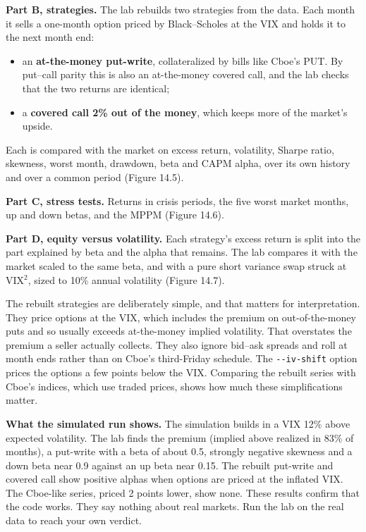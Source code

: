 \textbf{Part B, strategies.} The lab rebuilds two strategies from the data. Each month it sells a one-month option priced by Black--Scholes at the VIX and holds it to the next month end:

\begin{itemize}
  \item an \textbf{at-the-money put-write}, collateralized by bills like Cboe's PUT. By put--call parity this is also an at-the-money covered call, and the lab checks that the two returns are identical;
  \item a \textbf{covered call 2\% out of the money}, which keeps more of the market's upside.
\end{itemize}

Each is compared with the market on excess return, volatility, Sharpe ratio, skewness, worst month, drawdown, beta and CAPM alpha, over its own history and over a common period (Figure 14.5).

\textbf{Part C, stress tests.} Returns in crisis periods, the five worst market months, up and down betas, and the MPPM (Figure 14.6).

\textbf{Part D, equity versus volatility.} Each strategy's excess return is split into the part explained by beta and the alpha that remains. The lab compares it with the market scaled to the same beta, and with a pure short variance swap struck at VIX$^2$, sized to 10\% annual volatility (Figure 14.7).

The rebuilt strategies are deliberately simple, and that matters for interpretation. They price options at the VIX, which includes the premium on out-of-the-money puts and so usually exceeds at-the-money implied volatility. That overstates the premium a seller actually collects. They also ignore bid--ask spreads and roll at month ends rather than on Cboe's third-Friday schedule. The \texttt{-{}-iv-shift} option prices the options a few points below the VIX. Comparing the rebuilt series with Cboe's indices, which use traded prices, shows how much these simplifications matter.

\textbf{What the simulated run shows.} The simulation builds in a VIX 12\% above expected volatility. The lab finds the premium (implied above realized in 83\% of months), a put-write with a beta of about 0.5, strongly negative skewness and a down beta near 0.9 against an up beta near 0.15. The rebuilt put-write and covered call show positive alphas when options are priced at the inflated VIX. The Cboe-like series, priced 2 points lower, show none. These results confirm that the code works. They say nothing about real markets. Run the lab on the real data to reach your own verdict.

